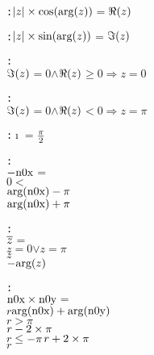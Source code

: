 \begin{alltt}
  :  \(\optimestwofn{\absonefn{z}}{\pvsid{cos}\pvsid{(}\pvsid{arg}\pvsid{(}z\pvsid{)}\pvsid{)}}\) \(=\) \(\Reonefn{z}\)\vspace*{\pvsdeclspacing}

  :  \(\optimestwofn{\absonefn{z}}{\pvsid{sin}\pvsid{(}\pvsid{arg}\pvsid{(}z\pvsid{)}\pvsid{)}}\) \(=\) \(\Imonefn{z}\)\vspace*{\pvsdeclspacing}

  : 
    \(\Imonefn{z}\) \(=\) \(0\) \(\wedge\) \(\Reonefn{z}\) \(\geq\) \(0\) \(\Rightarrow\) \pvsid{(}\(z\)\pvsid{)} \(=\) \(0\)\vspace*{\pvsdeclspacing}

  : 
    \(\Imonefn{z}\) \(=\) \(0\) \(\wedge\) \(\Reonefn{z}\) \(<\) \(0\) \(\Rightarrow\) \pvsid{(}\(z\)\pvsid{)} \(=\) \(\pi\)\vspace*{\pvsdeclspacing}

  :  \pvsid{(}\({\imath}\)\pvsid{)} \(=\) \(\opdividetwofn{\pi}{2}\)\vspace*{\pvsdeclspacing}

  : 
    \pvsid{(}\(\opdifferenceonefn{\pvsid{n0x}}\)\pvsid{)} \(=\)
      \(0\) \(<\) \pvsid{(}\pvsid{)}
        \(\opdifferencetwofn{\pvsid{arg}\pvsid{(}\pvsid{n0x}\pvsid{)}}{\pi}\)
      \(\opplustwofn{\pvsid{arg}\pvsid{(}\pvsid{n0x}\pvsid{)}}{\pi}\)
     \vspace*{\pvsdeclspacing}

  : 
    \pvsid{(}\(\conjugateonefn{z}\)\pvsid{)} \(=\)
      \pvsid{(}\(z\)\pvsid{)} \(=\) \(0\) \(\vee\) \pvsid{(}\(z\)\pvsid{)} \(=\) \(\pi\)
        \pvsid{(}\(z\)\pvsid{)}
      \(\opdifferenceonefn{\pvsid{arg}\pvsid{(}z\pvsid{)}}\)
     \vspace*{\pvsdeclspacing}

  : 
    \pvsid{(}\(\optimestwofn{\pvsid{n0x}}{\pvsid{n0y}}\)\pvsid{)} \(=\)
      \(r\) \pvskey{=} \(\opplustwofn{\pvsid{arg}\pvsid{(}\pvsid{n0x}\pvsid{)}}{\pvsid{arg}\pvsid{(}\pvsid{n0y}\pvsid{)}}\) 
        \(r\) \(>\) \(\pi\)
          \(\opdifferencetwofn{r}{\optimestwofn{2}{\pi}}\)
        \(r\) \(\leq\) \(\opdifferenceonefn{\pi}\)  \(\opplustwofn{r}{\optimestwofn{2}{\pi}}\)
        \(r\)
       \vspace*{\pvsdeclspacing}


\end{alltt}
